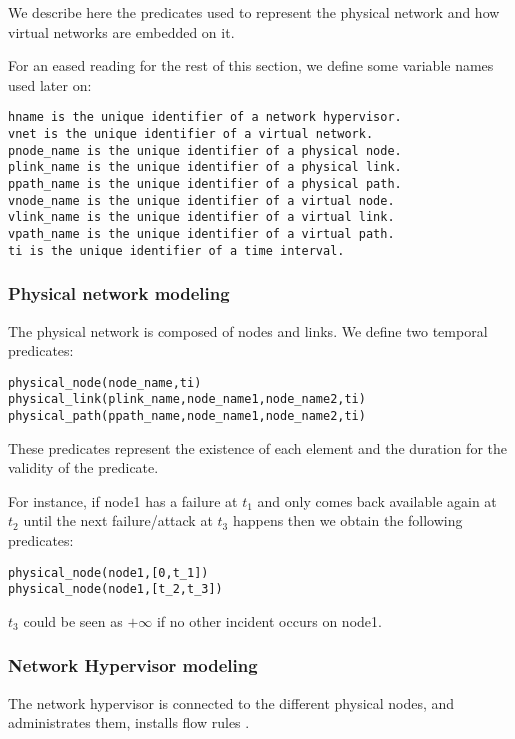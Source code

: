 We describe here the predicates used to represent the physical network and how virtual networks are embedded on it.

For an eased reading for the rest of this section, we define some variable names used later on:

\begin{lstlisting}[backgroundcolor = \color{lightgray}]
hname is the unique identifier of a network hypervisor.
vnet is the unique identifier of a virtual network.
pnode_name is the unique identifier of a physical node.
plink_name is the unique identifier of a physical link.
ppath_name is the unique identifier of a physical path.
vnode_name is the unique identifier of a virtual node.
vlink_name is the unique identifier of a virtual link.
vpath_name is the unique identifier of a virtual path.
ti is the unique identifier of a time interval.
\end{lstlisting}

\subsubsection{Physical network modeling}


The physical network is composed of nodes and links. We define two temporal predicates:

\begin{lstlisting}[backgroundcolor = \color{lightgray}]
physical_node(node_name,ti)
physical_link(plink_name,node_name1,node_name2,ti)
physical_path(ppath_name,node_name1,node_name2,ti)
\end{lstlisting}

These predicates represent the existence of each element and the duration for the validity of the predicate.

For instance, if node1 has a failure at $t_1$ and only comes back available again at $t_2$ until the next failure/attack at $t_3$ happens then we obtain the following predicates:

\begin{lstlisting}[backgroundcolor = \color{lightgray}]
physical_node(node1,[0,t_1])
physical_node(node1,[t_2,t_3])
\end{lstlisting}

$t_3$ could be seen as $+\infty$ if no other incident occurs on node1.


\subsubsection{Network Hypervisor modeling}
The network hypervisor is connected to the different physical nodes, and administrates them, installs flow rules \etc.

